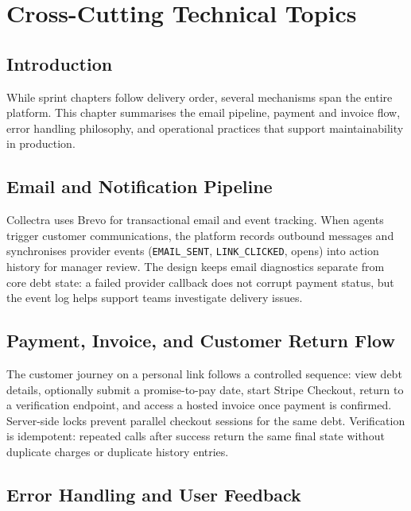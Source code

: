 \documentclass[12pt,a4paper]{report}
\begin{document}
\chapter{Cross-Cutting Technical Topics}
\label{chap:crosscutting}

\section*{Introduction}
{}

While sprint chapters follow delivery order, several mechanisms span the entire platform.
This chapter summarises the email pipeline, payment and invoice flow, error handling philosophy,
and operational practices that support maintainability in production.

\section{Email and Notification Pipeline}

Collectra uses Brevo for transactional email and event tracking.
When agents trigger customer communications, the platform records outbound messages and
synchronises provider events (\texttt{EMAIL\_SENT}, \texttt{LINK\_CLICKED}, opens) into
action history for manager review.
The design keeps email diagnostics separate from core debt state: a failed provider callback
does not corrupt payment status, but the event log helps support teams investigate delivery issues.

\section{Payment, Invoice, and Customer Return Flow}

The customer journey on a personal link follows a controlled sequence:
view debt details, optionally submit a promise-to-pay date, start Stripe Checkout, return to
a verification endpoint, and access a hosted invoice once payment is confirmed.
Server-side locks prevent parallel checkout sessions for the same debt.
Verification is idempotent: repeated calls after success return the same final state without
duplicate charges or duplicate history entries.

\section{Error Handling and User Feedback}
\end{document}
